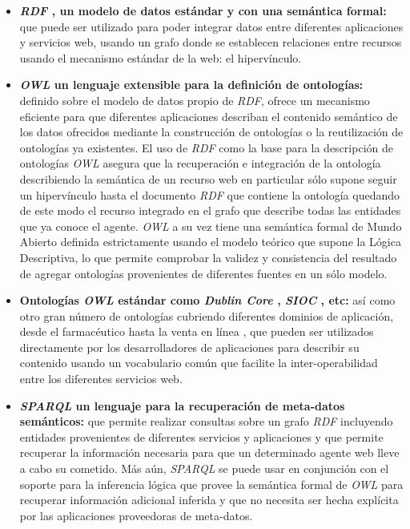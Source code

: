 \begin{itemize}

\item \textbf{\textit{RDF} \cite{rdf}, un modelo de datos est\'andar y con una sem\'antica formal:} que puede ser utilizado para poder integrar datos entre diferentes aplicaciones y servicios web, usando un grafo donde se establecen relaciones entre recursos usando el mecanismo est\'andar de la web: el hiperv\'inculo.

\item \textbf{\textit{OWL} \cite{owl} un lenguaje extensible para la definici\'on de ontolog\'ias:} definido sobre el modelo de datos propio de {\it RDF}, ofrece un mecanismo eficiente para que diferentes aplicaciones describan el contenido sem\'antico de los datos ofrecidos mediante la construcci\'on de ontolog\'ias o la reutilizaci\'on de ontolog\'ias ya existentes. El uso de {\it RDF} como la base para la descripci\'on de ontolog\'ias {\it OWL} asegura que la recuperaci\'on e integraci\'on de la ontolog\'ia describiendo la sem\'antica de un recurso web en particular s\'olo supone seguir un hiperv\'inculo hasta el documento {\it RDF} que contiene la ontolog\'ia quedando de este modo el recurso integrado en el grafo que describe todas las entidades que ya conoce el agente. {\it OWL} a su vez tiene una sem\'antica formal de Mundo Abierto \cite{owl_semantics} definida estrictamente usando el modelo te\'orico que supone la L\'ogica Descriptiva, lo que permite comprobar la validez y consistencia del resultado de agregar ontolog\'ias provenientes de diferentes fuentes en un s\'olo modelo. 

\item \textbf{Ontolog\'ias \textit{OWL} est\'andar como \textit{Dublin Core} \cite{dublin_core}, \textit{SIOC} \cite{sioc}, etc:} as\'i como otro gran n\'umero de ontolog\'ias cubriendo diferentes dominios de aplicaci\'on, desde el farmac\'eutico \cite{denney2009pharma} hasta la venta en l\'inea \cite{goodrelations}, que pueden ser utilizados directamente por los desarrolladores de aplicaciones para describir su contenido usando un vocabulario com\'un que facilite la inter-operabilidad entre los diferentes servicios web.

\item \textbf{\textit{SPARQL} \cite{sparql} un lenguaje para la recuperaci\'on de meta-datos sem\'anticos:} que permite realizar consultas sobre un grafo {\it RDF} incluyendo entidades provenientes de diferentes servicios y aplicaciones y que permite recuperar la informaci\'on necesaria para que un determinado agente web lleve a cabo su cometido. M\'as a\'un, {\it SPARQL} se puede usar en conjunci\'on con el soporte para la inferencia l\'ogica que provee la sem\'antica formal de {\it OWL} para recuperar informaci\'on adicional inferida y que no necesita ser hecha expl\'icita por las aplicaciones proveedoras de meta-datos.

\end{itemize}

